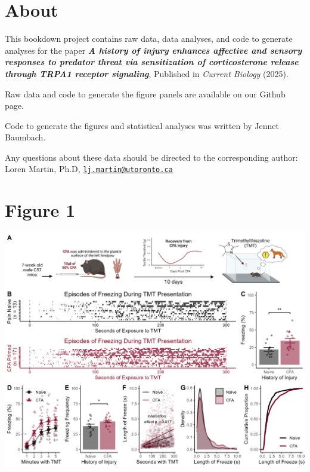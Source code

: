 \documentclass[
]{book}
\author{}
\date{\vspace{-2.5em}}
\begin{document}
{
\setcounter{tocdepth}{1}
\tableofcontents
}
\chapter*{About}\label{about}

This bookdown project contains raw data, data analyses, and code to generate analyses for the paper \textbf{\emph{A history of injury enhances affective and sensory responses to predator threat via sensitization of corticosterone release through TRPA1 receptor signaling}}, Published in \emph{Current Biology} (2025).

Raw data and code to generate the figure panels are available on our Github page.

Code to generate the figures and statistical analyses was written by Jennet Baumbach.

Any questions about these data should be directed to the corresponding author: Loren Martin, Ph.D, \href{mailto:lj.martin@utoronto.ca}{\nolinkurl{lj.martin@utoronto.ca}}

\chapter*{Figure 1}\label{figure-1}

\includegraphics[width=37.5in]{Figs/1_TMT_CFA_Frz}
\end{document}
